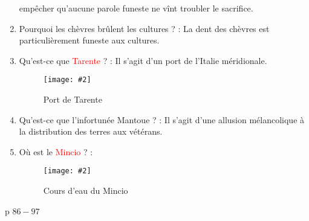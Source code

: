 \documentclass[a4paper, 11pt, hidelinks]{article}
\newcommand{\img}[4]{\begin{figure}[!ht]
    \centering
    \texttt{[image: \#2]}
    \caption{#3}
    \label{#4}
    \end{figure} }
\begin{document}
\begin{enumerate}
            empêcher qu'aucune parole funeste ne vînt troubler le sacrifice.
      \item Pourquoi les chèvres brûlent les cultures ? : La dent des chèvres est particulièrement funeste aux cultures.
      \item Qu'est-ce que \textcolor{red}{Tarente} ? : Il s'agit d'un port de l'Italie méridionale.
            \img{0.3}{Tarente.png}{Port de Tarente}{87}
            \newpage
      \item Qu'est-ce que l'infortunée Mantoue ? : Il s'agit d'une allusion mélancolique à la distribution des terres aux vétérans.
      \item Où est le \textcolor{red}{Mincio} ? :
            \img{0.4}{Mincio.png}{Cours d'eau du Mincio}{88}
\end{enumerate}


p $86 - 97$
\end{document}

